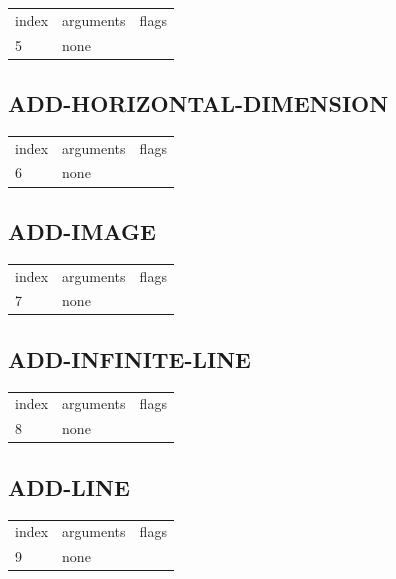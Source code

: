 \documentclass[a4paper]{report}
\begin{document}
\begin{center}
\begin{tabular}{l | l | l}
index & arguments & flags \\
5 & none & 
\end{tabular}
\end{center}

\subsection{ADD-HORIZONTAL-DIMENSION}

\begin{center}
\begin{tabular}{l | l | l}
index & arguments & flags \\
6 & none & 
\end{tabular}
\end{center}

\subsection{ADD-IMAGE}

\begin{center}
\begin{tabular}{l | l | l}
index & arguments & flags \\
7 & none & 
\end{tabular}
\end{center}

\subsection{ADD-INFINITE-LINE}

\begin{center}
\begin{tabular}{l | l | l}
index & arguments & flags \\
8 & none & 
\end{tabular}
\end{center}

\subsection{ADD-LINE}

\begin{center}
\begin{tabular}{l | l | l}
index & arguments & flags \\
9 & none & 
\end{tabular}
\end{center}
\end{document}
